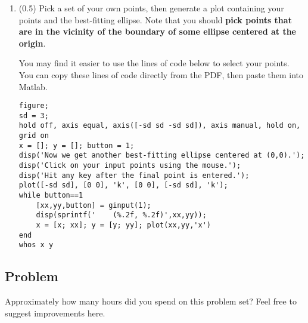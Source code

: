 \documentclass[11pt,titlepage,fleqn]{article}
\begin{document}
\begin{enumerate}
\begin{enumerate}

\item Check that the result is the same as if you simply use the ``\verb+\+'' command: \verb+m = G\d+.

\item Produce a plot showing both the data and the best-fitting ellipse.

\end{enumerate}


\item (0.5) Pick a set of your own points, then generate a plot containing your points and the best-fitting ellipse. Note that you should {\bf pick points that are in the vicinity of the boundary of some ellipse centered at the origin}.

You may find it easier to use the lines of code below to select your points. You can copy these lines of code directly from the PDF, then paste them into Matlab.

\small
\begin{spacing}{1.0}
\begin{verbatim}
figure;
sd = 3;
hold off, axis equal, axis([-sd sd -sd sd]), axis manual, hold on, grid on
x = []; y = []; button = 1;
disp('Now we get another best-fitting ellipse centered at (0,0).');
disp('Click on your input points using the mouse.');
disp('Hit any key after the final point is entered.');
plot([-sd sd], [0 0], 'k', [0 0], [-sd sd], 'k');
while button==1
    [xx,yy,button] = ginput(1);
    disp(sprintf('    (%.2f, %.2f)',xx,yy));
    x = [x; xx]; y = [y; yy]; plot(xx,yy,'x')
end
whos x y
\end{verbatim}
\end{spacing}

\end{enumerate}


\subsection*{Problem}

Approximately how many hours did you spend on this problem set? Feel free to suggest improvements here.




\end{document}
